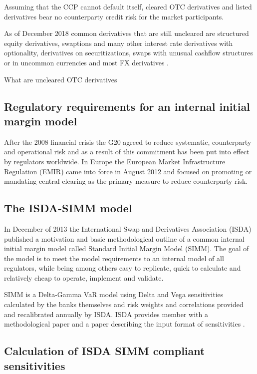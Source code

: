 \documentclass[../Thesis_AHoecherl.tex]{subfiles}
\begin{document}
    Assuming that the CCP cannot default itself, cleared OTC derivatives and listed derivatives bear no counterparty credit risk for the market participants.
    
    As of December 2018 common derivatives that are still uncleared are structured equity derivatives, swaptions and many other interest rate derivatives with optionality, derivatives on securitizations, swaps with unusual cashflow structures or in uncommon currencies and most FX derivatives \citep{BISOTCStats}.
    
    
    
    What are uncleared OTC derivatives
    
    
    \subsection{Regulatory requirements for an internal initial margin model}
    After the 2008 financial crisis the G20 agreed to reduce systematic, counterparty and operational risk and as a result of this commitment has been put into effect by regulators worldwide. In Europe the European Market Infrastructure Regulation (EMIR) came into force in August 2012 and focused on promoting or mandating central clearing as the primary measure to reduce counterparty risk.

    
    \subsection{The ISDA-SIMM model}
    In December of 2013 the International Swap and Derivatives Association (ISDA) published a motivation and basic methodological outline of a common internal initial margin model called Standard Initial Margin Model (SIMM\texttrademark)\citep{ISDADec2013}. The goal of the model is to meet the model requirements to an internal model of all regulators, while being among others easy to replicate, quick to calculate and relatively cheap to operate, implement and validate.

    SIMM is a Delta-Gamma VaR model using Delta and Vega sensitivities calculated by the banks themselves and risk weights and correlations provided and recalibrated annually by ISDA. ISDA provides member with a methodological paper \citep{SIMM} and a paper describing the input format of sensitivities \citep{RiskDataStandard}.

    \subsection{Calculation of ISDA SIMM compliant sensitivities}
\end{document}
